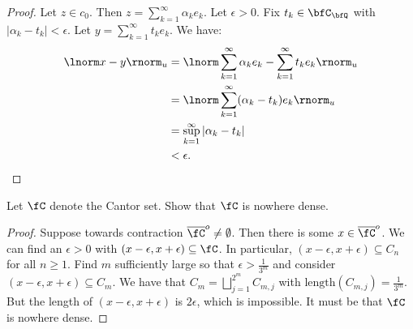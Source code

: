 \documentclass[11pt,twoside,openany]{memoir}
\begin{document}
        \begin{proof}
            Let $z \in c_0$. Then $z = \sum_{k = 1}^\infty \alpha_k e_k$. Let $\epsilon > 0$. Fix $t_k \in \bfC_\bfQ$ with $|\alpha_k - t_k| < \epsilon$. Let $y = \sum_{k = 1}^\infty t_k e_k$. We have:
                \begin{equation*}
                \begin{split}
                    \lnorm x-y \rnorm_u 
                    & = \lnorm \sum_{k = 1}^\infty \alpha_k e_k - \sum_{k = 1}^\infty t_k e_k \rnorm_u \\
                    & = \lnorm \sum_{k = 1}^\infty (\alpha_k - t_k)e_k \rnorm_u \\
                    & = \sup_{k = 1}^\infty |\alpha_k - t_k| \\
                    & < \epsilon.
                \end{split}
                \end{equation*}
        \end{proof}
    \begin{exercise}
        Let $\fC$ denote the Cantor set. Show that $\fC$ is nowhere dense.
    \end{exercise}
        \begin{proof}
            Suppose towards contraction $\overline{\fC}^o \neq \emptyset$. Then there is some $x \in \overline{\fC}^o$. We can find an $\epsilon > 0$ with $(x-\epsilon,x+\epsilon) \subseteq \fC$. In particular, $(x-\epsilon,x+\epsilon) \subseteq C_n$ for all $n \geq 1$. Find $m$ sufficiently large so that $\epsilon > \frac{1}{3^m}$ and consider $(x-\epsilon,x+\epsilon) \subseteq C_m$. We have that  $C_m = \bigsqcup_{j = 1}^{2^m}C_{m,j}$ with $\text{length}(C_{m,j}) = \frac{1}{3^m}$. But the length of $(x-\epsilon,x+\epsilon)$ is $2\epsilon$, which is impossible. It must be that $\fC$ is nowhere dense.
        \end{proof}
\end{document}
